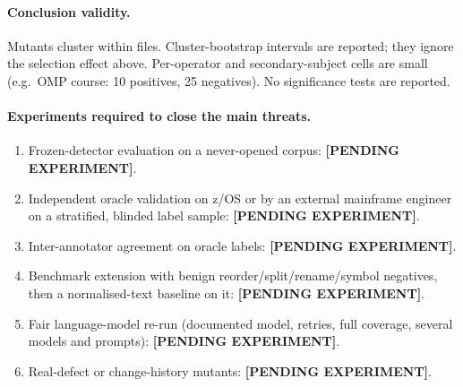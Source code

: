\paragraph{Conclusion validity.}
Mutants cluster within files. Cluster-bootstrap intervals are reported; they
ignore the selection effect above. Per-operator and secondary-subject cells are
small (e.g.\ OMP course: 10 positives, 25 negatives). No significance tests are
reported.

\paragraph{Experiments required to close the main threats.}
\begin{enumerate}
  \item Frozen-detector evaluation on a never-opened corpus:
    \textbf{[PENDING EXPERIMENT]}.
  \item Independent oracle validation on z/OS or by an external mainframe engineer
    on a stratified, blinded label sample: \textbf{[PENDING EXPERIMENT]}.
  \item Inter-annotator agreement on oracle labels: \textbf{[PENDING EXPERIMENT]}.
  \item Benchmark extension with benign reorder/split/rename/symbol negatives,
    then a normalised-text baseline on it: \textbf{[PENDING EXPERIMENT]}.
  \item Fair language-model re-run (documented model, retries, full coverage,
    several models and prompts): \textbf{[PENDING EXPERIMENT]}.
  \item Real-defect or change-history mutants: \textbf{[PENDING EXPERIMENT]}.
\end{enumerate}
